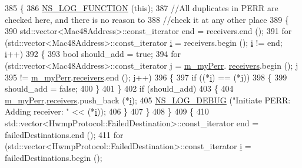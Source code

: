 \begin{DoxyCode}
385 \{
386   \hyperlink{log-macros-disabled_8h_a90b90d5bad1f39cb1b64923ea94c0761}{NS\_LOG\_FUNCTION} (\textcolor{keyword}{this});
387   \textcolor{comment}{//All duplicates in PERR are checked here, and there is no reason to}
388   \textcolor{comment}{//check it at any other place}
389   \{
390     std::vector<Mac48Address>::const\_iterator end = receivers.end ();
391     \textcolor{keywordflow}{for} (std::vector<Mac48Address>::const\_iterator \hyperlink{bernuolliDistribution_8m_a6f6ccfcf58b31cb6412107d9d5281426}{i} = receivers.begin (); \hyperlink{bernuolliDistribution_8m_a6f6ccfcf58b31cb6412107d9d5281426}{i} != end; 
      \hyperlink{bernuolliDistribution_8m_a6f6ccfcf58b31cb6412107d9d5281426}{i}++)
392       \{
393         \textcolor{keywordtype}{bool} should\_add = \textcolor{keyword}{true};
394         \textcolor{keywordflow}{for} (std::vector<Mac48Address>::const\_iterator j = \hyperlink{classns3_1_1dot11s_1_1HwmpProtocolMac_a5b736c13ed78e292ee147e4151b96171}{m\_myPerr}.
      \hyperlink{structns3_1_1dot11s_1_1HwmpProtocolMac_1_1MyPerr_a9ecf059f0bd93868766ad55de8402784}{receivers}.begin (); j
395              != \hyperlink{classns3_1_1dot11s_1_1HwmpProtocolMac_a5b736c13ed78e292ee147e4151b96171}{m\_myPerr}.\hyperlink{structns3_1_1dot11s_1_1HwmpProtocolMac_1_1MyPerr_a9ecf059f0bd93868766ad55de8402784}{receivers}.end (); j++)
396           \{
397             \textcolor{keywordflow}{if} ((*\hyperlink{bernuolliDistribution_8m_a6f6ccfcf58b31cb6412107d9d5281426}{i}) == (*j))
398               \{
399                 should\_add = \textcolor{keyword}{false};
400               \}
401           \}
402         \textcolor{keywordflow}{if} (should\_add)
403           \{
404             \hyperlink{classns3_1_1dot11s_1_1HwmpProtocolMac_a5b736c13ed78e292ee147e4151b96171}{m\_myPerr}.\hyperlink{structns3_1_1dot11s_1_1HwmpProtocolMac_1_1MyPerr_a9ecf059f0bd93868766ad55de8402784}{receivers}.push\_back (*\hyperlink{bernuolliDistribution_8m_a6f6ccfcf58b31cb6412107d9d5281426}{i});
405             \hyperlink{group__logging_ga413f1886406d49f59a6a0a89b77b4d0a}{NS\_LOG\_DEBUG} (\textcolor{stringliteral}{"Initiate PERR:  Adding receiver: "} << (*\hyperlink{bernuolliDistribution_8m_a6f6ccfcf58b31cb6412107d9d5281426}{i}));
406           \}
407       \}
408   \}
409   \{
410     std::vector<HwmpProtocol::FailedDestination>::const\_iterator end = failedDestinations.end ();
411     \textcolor{keywordflow}{for} (std::vector<HwmpProtocol::FailedDestination>::const\_iterator \hyperlink{bernuolliDistribution_8m_a6f6ccfcf58b31cb6412107d9d5281426}{i} = failedDestinations.begin (); 

\end{DoxyCode}
